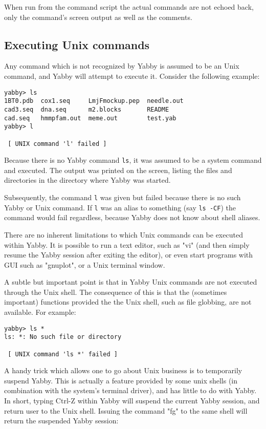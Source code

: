 When run from the command script the actual commands are not
echoed back, only the command's screen output as well as the
comments.

\subsection{Executing Unix commands}


Any command which is not recognized by Yabby is assumed to be
an Unix command, and Yabby will attempt to execute it. Consider
the following example:

\begin{verbatim}
yabby> ls
1BT0.pdb  cox1.seq     LmjFmockup.pep  needle.out
cad3.seq  dna.seq      m2.blocks       README
cad.seq   hmmpfam.out  meme.out        test.yab
yabby> l

 [ UNIX command 'l' failed ]
\end{verbatim}

Because there is no Yabby command {\tt ls}, it was assumed to
be a system command and executed.  The output was printed on
the screen, listing the files and directories in the directory
where Yabby was started.

Subsequently, the command {\tt l} was given but failed because
there is no such Yabby or Unix command. If {\tt l} was an alias
to something (say {\tt ls -CF}) the command would fail regardless,
because Yabby does not know about shell aliases.

There are no inherent limitations to which Unix commands can be
executed within Yabby. It is possible to run a text editor, such
as "vi" (and then simply resume the Yabby session after exiting
the editor), or even start programs with GUI such as "gnuplot",
or a Unix terminal window.

A subtle but important point is that in Yabby Unix commands are
not executed through the Unix shell.  The consequence of this
is that the (sometimes important) functions provided the the
Unix shell, such as file globbing, are not available. For example:

\begin{verbatim}
yabby> ls *
ls: *: No such file or directory

 [ UNIX command 'ls *' failed ]
\end{verbatim}

A handy trick which allows one to go about Unix business is
to temporarily suspend Yabby. This is actually a feature provided
by some unix shells (in combination with the system's terminal driver),
and has little to do with Yabby. In short, typing Ctrl-Z within
Yabby will suspend the current Yabby session, and return user
to the Unix shell. Issuing the command "fg" to the same shell
will return the suspended Yabby session:

